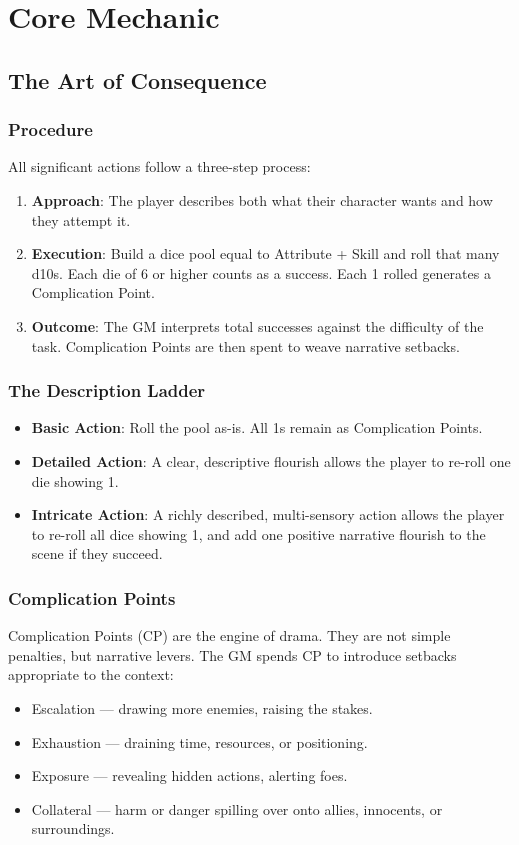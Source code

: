 \documentclass[11pt]{article}
\begin{document}
\section{Core Mechanic}

\subsection{The Art of Consequence}

\subsubsection{Procedure}
All significant actions follow a three-step process:
\begin{enumerate}
    \item \textbf{Approach}: The player describes both what their character wants and how they attempt it.
    \item \textbf{Execution}: Build a dice pool equal to Attribute + Skill and roll that many d10s. Each die of 6 or higher counts as a success. Each 1 rolled generates a Complication Point.
    \item \textbf{Outcome}: The GM interprets total successes against the difficulty of the task. Complication Points are then spent to weave narrative setbacks.
\end{enumerate}

\subsubsection{The Description Ladder}
\begin{itemize}
    \item \textbf{Basic Action}: Roll the pool as-is. All 1s remain as Complication Points.
    \item \textbf{Detailed Action}: A clear, descriptive flourish allows the player to re-roll one die showing 1.
    \item \textbf{Intricate Action}: A richly described, multi-sensory action allows the player to re-roll all dice showing 1, and add one positive narrative flourish to the scene if they succeed.
\end{itemize}

\subsubsection{Complication Points}
Complication Points (CP) are the engine of drama. They are not simple penalties, but narrative levers. The GM spends CP to introduce setbacks appropriate to the context:
\begin{itemize}
    \item Escalation — drawing more enemies, raising the stakes.
    \item Exhaustion — draining time, resources, or positioning.
    \item Exposure — revealing hidden actions, alerting foes.
    \item Collateral — harm or danger spilling over onto allies, innocents, or surroundings.
\end{itemize}
\end{document}
